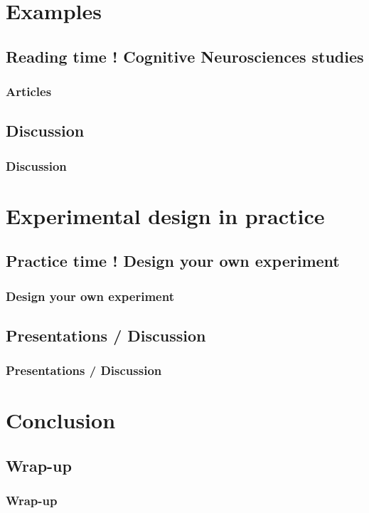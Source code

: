 \documentclass[xcolor=dvipsnames,english]{beamer}
\begin{document}
\section{Examples}
\subsection{Reading time ! Cognitive Neurosciences studies}

\begin{frame}
  \frametitle{Articles}
\end{frame}

\subsection{Discussion}

\begin{frame}
  \frametitle{Discussion}
\end{frame}


\section{Experimental design in practice}
\subsection{Practice time ! Design your own experiment}

\begin{frame}
  \frametitle{Design your own experiment}
\end{frame}

\subsection{Presentations / Discussion}

\begin{frame}
  \frametitle{Presentations / Discussion}
\end{frame}


\section{Conclusion}
\subsection{Wrap-up}

\begin{frame}
  \frametitle{Wrap-up}
\end{frame}
\end{document}
